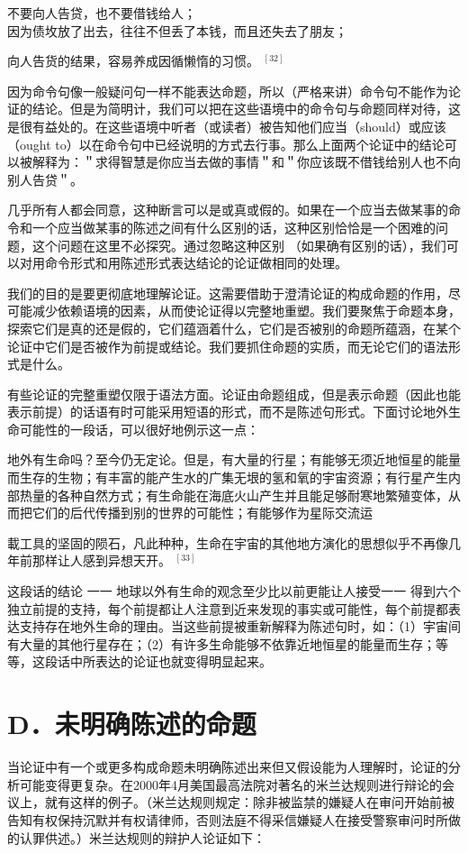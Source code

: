 \begin{displayquote}
不要向人告贷，也不要借钱给人；\\
因为债坆放了出去，往往不但丢了本钱，而且还失去了朋友；
\end{displayquote}

向人告货的结果，容易养成因循懒惰的习惯。 ${ }^{[32]}$

因为命令句像一般疑问句一样不能表达命题，所以（严格来讲）命令句不能作为论证的结论。但是为简明计，我们可以把在这些语境中的命令句与命题同样对待，这是很有益处的。在这些语境中听者（或读者）被告知他们应当（should）或应该（ought to）以在命令句中已经说明的方式去行事。那么上面两个论证中的结论可以被解释为：＂求得智慧是你应当去做的事情＂和＂你应该既不借钱给别人也不向别人告贷＂。

几乎所有人都会同意，这种断言可以是或真或假的。如果在一个应当去做某事的命令和一个应当做某事的陈述之间有什么区别的话，这种区别恰恰是一个困难的问题，这个问题在这里不必探究。通过忽略这种区别 （如果确有区别的话），我们可以对用命令形式和用陈述形式表达结论的论证做相同的处理。

我们的目的是要更彻底地理解论证。这需要借助于澄清论证的构成命题的作用，尽可能减少依赖语境的因素，从而使论证得以完整地重塑。我们要聚焦于命题本身，探索它们是真的还是假的，它们蕴涵着什么，它们是否被别的命题所蕴涵，在某个论证中它们是否被作为前提或结论。我们要抓住命题的实质，而无论它们的语法形式是什么。

有些论证的完整重塑仅限于语法方面。论证由命题组成，但是表示命题（因此也能表示前提）的话语有时可能采用短语的形式，而不是陈述句形式。下面讨论地外生命可能性的一段话，可以很好地例示这一点：

地外有生命吗？至今仍无定论。但是，有大量的行星；有能够无须近地恒星的能量而生存的生物；有丰富的能产生水的广集无垠的氢和氧的宇宙资源；有行星产生内部热量的各种自然方式；有生命能在海底火山产生并且能足够耐寒地繁殖变体，从而把它们的后代传播到别的世界的可能性；有能够作为星际交流运

載工具的坚固的陨石，凡此种种，生命在宇宙的其他地方演化的思想似乎不再像几年前那样让人感到异想天开。 ${ }^{[33]}$

这段话的结论 一一 地球以外有生命的观念至少比以前更能让人接受一一 得到六个独立前提的支持，每个前提都让人注意到近来发现的事实或可能性，每个前提都表达支持存在地外生命的理由。当这些前提被重新解释为陈述句时，如：（1）宇宙间有大量的其他行星存在；（2）有许多生命能够不依靠近地恒星的能量而生存；等等，这段话中所表达的论证也就变得明显起来。

\section*{D．未明确陈述的命题}
当论证中有一个或更多构成命题未明确陈述出来但又假设能为人理解时，论证的分析可能变得更复杂。在2000年4月美国最高法院对著名的米兰达规则进行辩论的会议上，就有这样的例子。（米兰达规则规定：除非被监禁的嫌疑人在审问开始前被告知有权保持沉默并有权请律师，否则法庭不得采信嫌疑人在接受警察审问时所做的认罪供述。）米兰达规则的辩护人论证如下：

